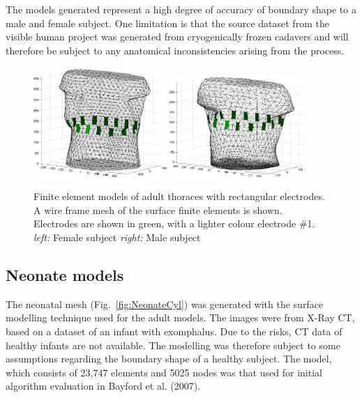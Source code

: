 \documentclass[12pt]{iopart}
\begin{document}
The models generated represent a high degree of accuracy of boundary
shape to a male and female subject.  One limitation is that the
source dataset from the visible
human project was generated from cryogenically frozen cadavers and
will therefore be subject to any anatomical inconsistencies arising from
the process.


\begin{figure}[bhtp]
\begin{center}
  \includegraphics[width= 0.45\textwidth]
         {figures/female_t_mdl.png}
  \includegraphics[width= 0.45\textwidth]
         {figures/male_t_mdl.png}
\caption{ \label{fig:AdultFEM}
Finite element models of adult thoraces with
rectangular electrodes. A wire frame mesh
of the surface finite elements is shown.
Electrodes are shown in green,
with a lighter colour electrode \#1.
{\em left:} Female subject
{\em right:} Male subject
}
\end{center}
\end{figure}


\subsection{Neonate models}

The neonatal mesh (Fig.\ \ref{fig:NeonateCyl})
 was generated with the surface modelling
technique used for the adult models. The images 
were from X-Ray CT, based on a 
dataset of an infant with exomphalus. Due to the
risks, CT data of healthy infants are not 
available. The modelling was therefore subject to
some assumptions regarding the boundary shape
of a healthy subject.  The model, which
consists of 23,747 elements and 5025 nodes was that used
for initial algorithm evaluation in Bayford et al. (2007).
\end{document}
